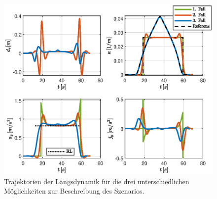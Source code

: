 \begin{figure}[h] 
	\centering
	\includegraphics[width=\linewidth]{./Bilder/Ergebnisse/Gerade_Kurve_Gerade/lat_dyn.eps}
	\caption{Trajektorien der Längsdynamik für die drei unterschiedlichen Möglichkeiten zur Beschreibung des Szenarios.}
	\label{fig:gerade_kurve_gerade_lat_dyn}
\end{figure}  
